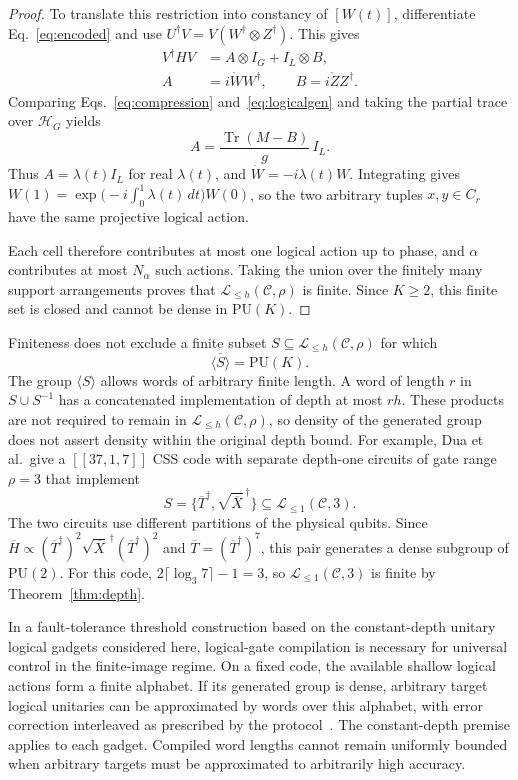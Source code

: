 \documentclass[aps,prl,reprint,notitlepage,nofootinbib,nobibnotes]{revtex4-2}
\newcommand{\HH}{\mathcal H}
\newcommand{\PU}{\mathrm{PU}}
\newcommand{\id}{I}
\newcommand{\tr}{\operatorname{Tr}}
\begin{document}
\begin{proof}
To translate this restriction into constancy of \([W(t)]\),
differentiate Eq.~\eqref{eq:encoded} and use
\(U^\dagger V=V(W^\dagger\otimes Z^\dagger)\). This gives
\begin{align}
  V^\dagger H V&=A\otimes\id_G+\id_L\otimes B,
       \label{eq:logicalgen}\\
  A&=i\dot W W^\dagger,\qquad B=i\dot Z Z^\dagger.\nonumber
\end{align}
Comparing Eqs.~\eqref{eq:compression} and~\eqref{eq:logicalgen}
and taking the partial trace over \(\HH_G\) yields
\[
  A=\frac{\tr(M-B)}{g}\,\id_L.
\]
Thus \(A=\lambda(t)\id_L\) for real \(\lambda(t)\), and
\(\dot W=-i\lambda(t)W\). Integrating gives
\(W(1)=\exp\!\bigl(-i\int_0^1\lambda(t)\,dt\bigr)W(0)\),
so the two arbitrary tuples \(x,y\in C_r\) have the same projective
logical action.

Each cell therefore contributes at most one logical action up to
phase, and \(\alpha\) contributes at most \(N_\alpha\) such actions.
Taking the union over the finitely many support arrangements proves
that \(\mathcal L_{\le h}(\mathcal C,\rho)\) is finite.
Since \(K\ge2\), this finite set is closed and cannot be dense in
\(\PU(K)\).
\end{proof}


Finiteness does not exclude a finite subset \(S\subseteq\mathcal L_{\le h}(\mathcal C,\rho)\)
for which
\[
 \overline{\langle S\rangle}=\PU(K).
\]
The group \(\langle S\rangle\) allows words of arbitrary finite length.
A word of length \(r\) in \(S\cup S^{-1}\) has a concatenated
implementation of depth at most \(rh\). These products are not required
to remain in \(\mathcal L_{\le h}(\mathcal C,\rho)\), so density of the generated group does not
assert density within the original depth bound.
For example, Dua et al.\ give a \([[37,1,7]]\) CSS code with separate depth-one
circuits of gate range \(\rho=3\) that
implement~\cite[Sec.~V and Appendix~B~3]{Dua}
\[
 S=\bigl\{\overline T^\dagger,
          \sqrt{\overline X}^{\,\dagger}\bigr\}
   \subseteq\mathcal L_{\le1}(\mathcal C,3).
\]
The two circuits use different partitions of the physical qubits.
Since \(\overline H\propto
(\overline T^\dagger)^2\sqrt{\overline X}^{\,\dagger}
(\overline T^\dagger)^2\) and
\(\overline T=(\overline T^\dagger)^7\), this pair generates a dense
subgroup of \(\PU(2)\). For this code,
\(2\lceil\log_3 7\rceil-1=3\), so \(\mathcal L_{\le1}(\mathcal C,3)\) is finite by
Theorem~\ref{thm:depth}.


In a fault-tolerance threshold construction based on the constant-depth
unitary logical gadgets considered here, logical-gate compilation is
necessary for universal control in the finite-image regime. On a fixed
code, the available shallow logical actions form a finite alphabet. If
its generated group is dense, arbitrary target logical unitaries can be
approximated by words over this alphabet, with error correction
interleaved as prescribed by the protocol~\cite{Gottesman,Dua}. The
constant-depth premise applies to each gadget. Compiled word lengths cannot
remain uniformly bounded when arbitrary targets must be approximated to
arbitrarily high accuracy.
\end{document}
